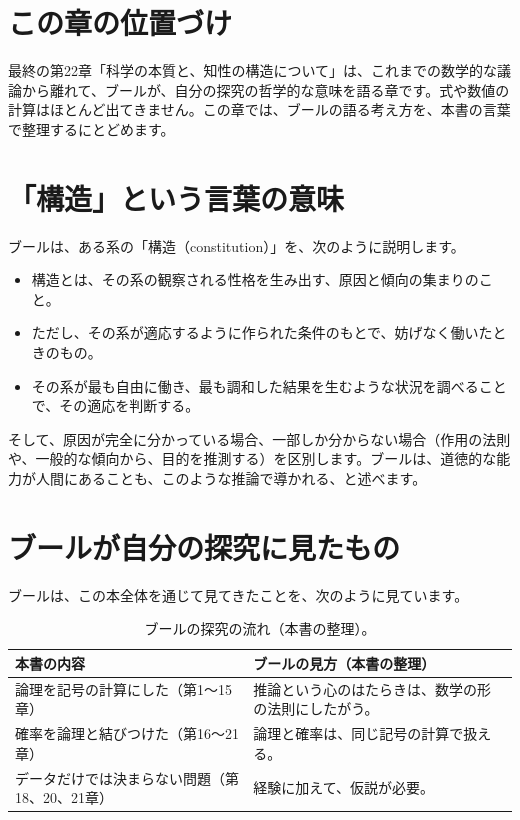 \documentclass[a4paper,11pt,openany]{ltjsbook}
\begin{document}
\section{この章の位置づけ}

最終の第22章「科学の本質と、知性の構造について」は、これまでの数学的な議論から離れて、ブールが、自分の探究の哲学的な意味を語る章です。式や数値の計算はほとんど出てきません。この章では、ブールの語る考え方を、本書の言葉で整理するにとどめます。

\section{「構造」という言葉の意味}

ブールは、ある系の「構造（constitution）」を、次のように説明します。

\begin{itemize}[leftmargin=*]
\item 構造とは、その系の観察される性格を生み出す、原因と傾向の集まりのこと。
\item ただし、その系が適応するように作られた条件のもとで、妨げなく働いたときのもの。
\item その系が最も自由に働き、最も調和した結果を生むような状況を調べることで、その適応を判断する。
\end{itemize}

そして、原因が完全に分かっている場合、一部しか分からない場合（作用の法則や、一般的な傾向から、目的を推測する）を区別します。ブールは、道徳的な能力が人間にあることも、このような推論で導かれる、と述べます。

\section{ブールが自分の探究に見たもの}

ブールは、この本全体を通じて見てきたことを、次のように見ています。

\begin{table}[htbp]
\centering
\small
\begin{tabular}{p{4.2cm}p{9cm}}
\toprule
本書の内容 & ブールの見方（本書の整理）\\
\midrule
論理を記号の計算にした（第1〜15章） & 推論という心のはたらきは、数学の形の法則にしたがう。\\
確率を論理と結びつけた（第16〜21章） & 論理と確率は、同じ記号の計算で扱える。\\
データだけでは決まらない問題（第18、20、21章） & 経験に加えて、仮説が必要。\\
\bottomrule
\end{tabular}
\caption{ブールの探究の流れ（本書の整理）。}
\end{table}
\end{document}
